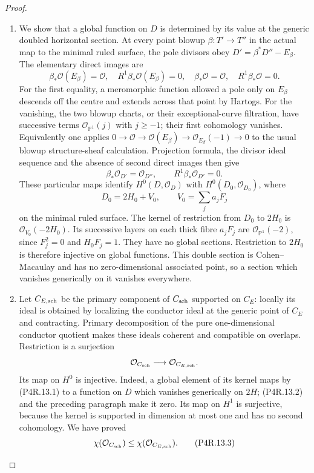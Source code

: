 \begin{proof}
\begin{enumerate}[label={$\langle1\rangle$\arabic*.},leftmargin=*]
\item We show that a global function on $D$ is determined by
its value at the generic doubled horizontal section.
At every point blowup $\beta:T'\to T''$ in the actual
map to the minimal ruled surface, the pole divisors obey
$D'=\beta^*D''-E_\beta$. The elementary direct images are
\[
 \beta_*\mathcal O(E_\beta)=\mathcal O,
 \quad R^1\beta_*\mathcal O(E_\beta)=0,
 \quad\beta_*\mathcal O=\mathcal O,
 \quad R^1\beta_*\mathcal O=0.
\]
For the first equality, a meromorphic function allowed
a pole only on $E_\beta$ descends off the centre and
extends across that point by Hartogs. For the vanishing,
the two blowup charts, or their exceptional-curve
filtration, have successive terms
$\mathcal O_{\mathbb P^1}(j)$ with $j\ge-1$;
their first cohomology vanishes. Equivalently one applies
$0\to\mathcal O\to\mathcal O(E_\beta)
\to\mathcal O_{E_\beta}(-1)\to0$ to the usual
blowup structure-sheaf calculation. Projection formula,
the divisor ideal sequence and the absence of second
direct images then give
\[
 \beta_*\mathcal O_{D'}=\mathcal O_{D''},
 \qquad R^1\beta_*\mathcal O_{D'}=0.                         \tag{P4R.13.2}
\]
These particular maps identify $H^0(D,\mathcal O_D)$
with $H^0(D_0,\mathcal O_{D_0})$, where
\[
 D_0=2H_0+V_0,
 \qquad V_0=\sum_j a_jF_j
\]
on the minimal ruled surface. The kernel of restriction
from $D_0$ to $2H_0$ is $\mathcal O_{V_0}(-2H_0)$.
Its successive layers on each thick fibre $a_jF_j$ are
$\mathcal O_{\mathbb P^1}(-2)$, since $F_j^2=0$ and
$H_0F_j=1$. They have no global sections. Restriction
to $2H_0$ is therefore injective on global functions.
This double section is Cohen--Macaulay and has no
zero-dimensional associated point, so a section which
vanishes generically on it vanishes everywhere.

\item Let $C_{E,\rm sch}$ be the primary component of
$C_{\rm sch}$ supported on $C_E$: locally its ideal
is obtained by localizing the conductor ideal at the
generic point of $C_E$ and contracting. Primary
decomposition of the pure one-dimensional conductor
quotient makes these ideals coherent and compatible
on overlaps. Restriction is a surjection
\[
 \mathcal O_{C_{\rm sch}}\longrightarrow
 \mathcal O_{C_{E,\rm sch}}.
\]
Its map on $H^0$ is injective. Indeed, a global element
of its kernel maps by (P4R.13.1) to a function on $D$
which vanishes generically on $2H$; (P4R.13.2) and the
preceding paragraph make it zero. Its map on $H^1$
is surjective, because the kernel is supported in
dimension at most one and has no second cohomology.
We have proved
\[
 \chi(\mathcal O_{C_{\rm sch}})
 \le\chi(\mathcal O_{C_{E,\rm sch}}).                       \tag{P4R.13.3}
\]


\end{enumerate}
\end{proof}
